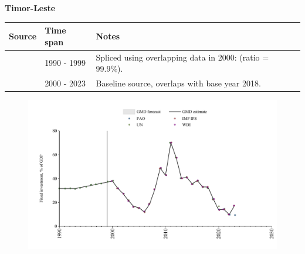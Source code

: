 \documentclass[12pt,a4paper,landscape]{article}
\begin{document}
\begin{adjustbox}{max totalsize={\paperwidth}{\paperheight},center}
\begin{minipage}[t][\textheight][t]{\textwidth}
\vspace*{0.5cm}
{}
\begin{center}
{\Large\bfseries Timor-Leste}
\end{center}
\vspace{0.5cm}
\begin{table}[H]
\centering
\small
\begin{tabular}{|l|l|l|}
\hline
\textbf{Source} & \textbf{Time span} & \textbf{Notes} \\
\hline
\rowcolor{white}\cite{UN}& 1990 - 1999 &Spliced using overlapping data in 2000: (ratio = 99.9\%).\\
\rowcolor{lightgray}\cite{WDI}& 2000 - 2023 &Baseline source, overlaps with base year 2018.\\
\hline
\end{tabular}
\end{table}
\begin{figure}[H]
\centering
\includegraphics[width=\textwidth,height=0.6\textheight,keepaspectratio]{graphs/TLS_finv_GDP.pdf}
\end{figure}
\end{minipage}
\end{adjustbox}
\end{document}
